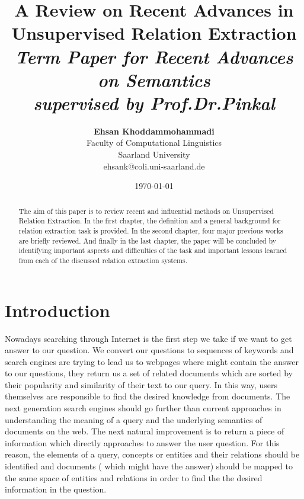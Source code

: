 \documentclass[12pt]{report}
\title{{\bf A Review on Recent Advances in Unsupervised Relation Extraction} \\
\it Term Paper for Recent Advances on Semantics \\ supervised by Prof.Dr.Pinkal}
\author{ {\bf Ehsan Khoddammohammadi}  \\
Faculty of Computational Linguistics \\
Saarland University\\
{\small ehsank@coli.uni-saarland.de}
}
\date{\today}
\begin{document}
\pagestyle{plain}
\maketitle

\pagebreak
\begin{abstract}

The aim of this paper is to review recent and influential methods on
Unsupervised Relation Extraction. In the first chapter, the definition and a general background
for relation extraction task is provided. In the second chapter, four major previous works are
briefly reviewed. And
finally in the last chapter, the paper will be concluded by identifying important aspects and
difficulties of the task and important lessons learned from each of the discussed relation extraction systems.

\end{abstract}

\pagebreak
\tableofcontents
\pagebreak

\cleardoublepage
{}

\chapter{Introduction}
\label{ch:intro}

Nowadays searching through Internet is the first step we take if we want to get answer to our question.
We convert our questions to sequences of keywords and search engines are trying 
to lead us to webpages where might contain the answer to our questions, they return us a set of related
documents which are sorted by their popularity and similarity of their text to our query.
In this way, users themselves are responsible to find the desired knowledge 
from documents. The next generation search engines should go further than current 
approaches in understanding the meaning of a query and the underlying semantics of documents on 
the web. The next natural improvement is to return a piece of information which directly approaches to 
answer the user question. For this reason, the elements of a query, concepts or entities and 
their relations should be identified and documents ( which might have the answer) should be mapped to the 
same space of entities and relations in order to find the the desired information in the question.
\end{document}
